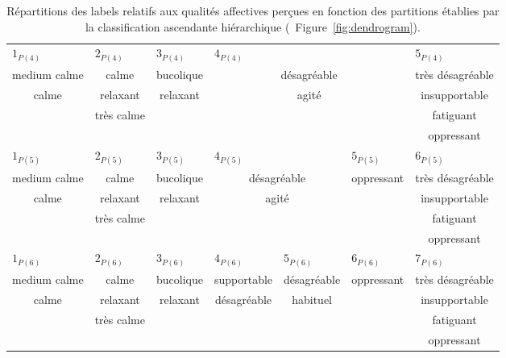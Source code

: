\begin{table}[t]
\begin{tabular}{c|c|c|c|c|c|c}
\hline
\multicolumn{1}{l|}{$1_{P(4)}$} & \multicolumn{1}{l|}{$2_{P(4)}$} & \multicolumn{1}{l|}{$3_{P(4)}$}  & \multicolumn{3}{l|}{$4_{P(4)}$} & \multicolumn{1}{l}{$5_{P(4)}$} \\
medium calme         & calme       & bucolique  & \multicolumn{3}{c|}{désagréable} & très désagréable\\
calme                & relaxant   & relaxant & \multicolumn{3}{c|}{agité}   & insupportable\\
                     & très calme  &          & \multicolumn{3}{c|}{}           & fatiguant\\
                     &            &          & \multicolumn{3}{c|}{}           & oppressant\\                                      
\hline
\multicolumn{1}{l|}{$1_{P(5)}$} & \multicolumn{1}{l|}{$2_{P(5)}$} & \multicolumn{1}{l|}{$3_{P(5)}$}  & \multicolumn{2}{l|}{$4_{P(5)}$} & \multicolumn{1}{l|}{$5_{P(5)}$} & \multicolumn{1}{l}{$6_{P(5)}$}\\ 
medium calme          & calme      & bucolique  & \multicolumn{2}{c|}{désagréable} & oppressant & très désagréable\\     
calme                 & relaxant   & relaxant   & \multicolumn{2}{c|}{agité}       &            & insupportable\\  
                      & très calme &            & \multicolumn{2}{c|}{}            &            & fatiguant \\  
                      &            &            & \multicolumn{2}{c|}{}            &            & oppressant \\               
\hline
\multicolumn{1}{l|}{$1_{P(6)}$} & \multicolumn{1}{l|}{$2_{P(6)}$} & \multicolumn{1}{l|}{$3_{P(6)}$}  & \multicolumn{1}{l|}{$4_{P(6)}$} & \multicolumn{1}{l|}{$5_{P(6)}$} & \multicolumn{1}{l|}{$6_{P(6)}$} & \multicolumn{1}{l}{$7_{P(6)}$} \\  
medium calme          & calme      & bucolique  & supportable    & désagréable  & oppressant & très désagréable \\        
calme                 & relaxant   & relaxant  & désagréable     & habituel     &            & insupportable \\  
                      & très calme &           &                 &              &            & fatiguant\\  
                      &            &           &                 &              &            & oppressant \\  
\hline
\end{tabular} 
\vspace{0.5mm}
\caption{Répartitions  des labels relatifs aux qualités affectives perçues en fonction des partitions établies par la classification ascendante hiérarchique (\cf~Figure~\ref{fig:dendrogram}).}
\label{tab:markerHacQualite}
\end{table}


